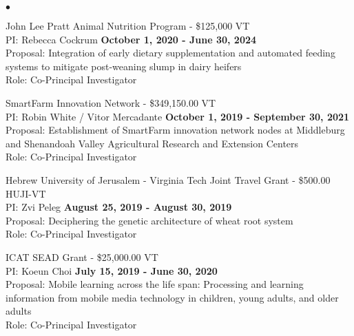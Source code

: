 \documentclass[margin,line,10pt]{res}
\newenvironment{list2}{
  \begin{list}{$\bullet$}{%
      \setlength{\itemsep}{0in}
      \setlength{\parsep}{0in} \setlength{\parskip}{0in}
      \setlength{\topsep}{0in} \setlength{\partopsep}{0in} 
      \setlength{\leftmargin}{0.2in}}}{\end{list}}
\begin{document}
\begin{resume}
\begin{list2}
\vspace{0.5cm}


\item John Lee Pratt Animal Nutrition Program - \$125,000  \hfill VT\\
PI: Rebecca Cockrum \hfill \textbf{October 1, 2020 - June 30, 2024}\\
Proposal: Integration of early dietary supplementation and automated feeding systems to mitigate post-weaning slump in dairy heifers\\
Role: Co-Principal Investigator \\

\vspace{0.5cm}


\item SmartFarm Innovation Network - \$349,150.00  \hfill VT\\
PI: Robin White / Vitor Mercadante  \hfill \textbf{October 1, 2019 - September 30, 2021}\\
Proposal: Establishment of SmartFarm innovation network nodes at Middleburg and Shenandoah Valley Agricultural Research and Extension Centers \\
Role: Co-Principal Investigator \\

\vspace{0.5cm}


\item  Hebrew University of Jerusalem - Virginia Tech Joint Travel Grant - \$500.00  \hfill HUJI-VT\\
PI: Zvi Peleg  \hfill \textbf{August 25, 2019 - August 30, 2019}\\
Proposal: Deciphering the genetic architecture of wheat root system \\
Role: Co-Principal Investigator \\


\vspace{0.5cm}



\item ICAT SEAD Grant - \$25,000.00  \hfill VT\\
PI: Koeun Choi  \hfill \textbf{July 15, 2019 - June 30, 2020}\\
Proposal:  Mobile learning across the life span: Processing and learning information from mobile media technology in children, young adults, and older adults \\
Role: Co-Principal Investigator \\



\end{list2}
\end{resume}
\end{document}
